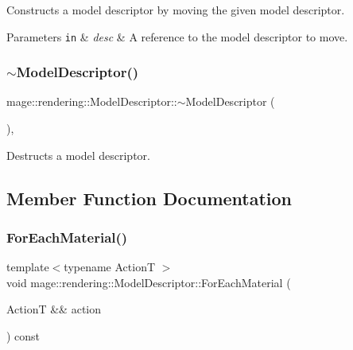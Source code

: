 Constructs a model descriptor by moving the given model descriptor.


\begin{DoxyParams}[1]{Parameters}
\mbox{\tt in}  & {\em desc} & A reference to the model descriptor to move. \\
\hline
\end{DoxyParams}
\mbox{\label{classmage_1_1rendering_1_1_model_descriptor_adef21799bc748828e8e04bc74f86aac0}} 
\subsubsection{\texorpdfstring{$\sim$\+Model\+Descriptor()}{~ModelDescriptor()}}
{\footnotesize\ttfamily mage\+::rendering\+::\+Model\+Descriptor\+::$\sim$\+Model\+Descriptor (\begin{DoxyParamCaption}{ }\end{DoxyParamCaption})\hspace{0.3cm}{\ttfamily [virtual]}, {\ttfamily [default]}}

Destructs a model descriptor. 

\subsection{Member Function Documentation}
\mbox{\label{classmage_1_1rendering_1_1_model_descriptor_a4e95ae12e0c952c76aaaf1ee457aed07}} 
\subsubsection{\texorpdfstring{For\+Each\+Material()}{ForEachMaterial()}}
{\footnotesize\ttfamily template$<$typename ActionT $>$ \\
void mage\+::rendering\+::\+Model\+Descriptor\+::\+For\+Each\+Material (\begin{DoxyParamCaption}\item[{ActionT \&\&}]{action }\end{DoxyParamCaption}) const}

